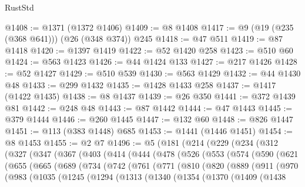 \begin{lexlean}{RustStd}
\begin{coremodule}
@1408 := @1371 (@1372 @1406)
@1409 := @8 @1408
@1417 := @9 (@19 (@235 (@368 @641))) (@26 (@348 @374)) @245
@1418 := @47 @511
@1419 := @87 @1418
@1420 := @1397 @1419
@1422 := @52 @1420 @258
@1423 := @510 @60
@1424 := @563 @1423
@1426 := @44 @1424 @133
@1427 := @217 @1426
@1428 := @52 @1427
@1429 := @510 @539
@1430 := @563 @1429
@1432 := @44 @1430 @48
@1433 := @299 @1432
@1435 := @1428 @1433 @258
@1437 := @1417 (@1422 @1435)
@1438 := @8 @1437
@1439 := @26 @350
@1441 := @372 @1439 @81
@1442 := @248 @48
@1443 := @87 @1442
@1444 := @47 @1443
@1445 := @379 @1444
@1446 := @260 @1445
@1447 := @132 @60
@1448 := @826 @1447
@1451 := @113 (@383 @1448) @685
@1453 := @1441 (@1446 @1451)
@1454 := @8 @1453
@1455 := @2 @7
@1496 := @5
    (@181
      (@214
        (@229
          (@234
            (@312
              (@327
                (@347
                  (@367
                    (@403
                      (@414
                        (@444
                          (@478
                            (@526
                              (@553
                                (@574
                                  (@590
                                    (@621
                                      (@655
                                        (@665
                                          (@689
                                            (@734
                                              (@742
                                                (@761
                                                  (@771
                                                    (@810
                                                      (@820
                                                        (@889
                                                          (@911
                                                            (@970
                                                              (@983
                                                                (@1035
                                                                  (@1245
                                                                    (@1294
                                                                      (@1313
                                                                        (@1340
                                                                          (@1354
                                                                            (@1370
                                                                              (@1409
                                                                                (@1438

\end{coremodule}
\end{lexlean}

